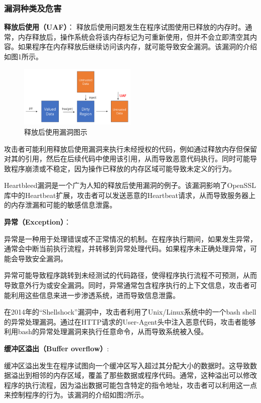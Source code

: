 \subsubsection{漏洞种类及危害}
\textbf{释放后使用（UAF）}：
	释放后使用问题发生在程序试图使用已释放的内存时。通常，内存释放后，操作系统会将该内存标记为可重新使用，但并不会立即清空其内容。如果程序在内存释放后继续访问该内存，就可能导致安全漏洞。该漏洞的介绍如图1所示。
	\begin{figure}[htbp]
		\centering
		\includegraphics[width=0.5\textwidth]{pictures/UAF.png}
		\caption{释放后使用漏洞图示}
		\label{fig:UAF}
	\end{figure}
攻击者可能利用释放后使用漏洞来执行未经授权的代码，例如通过释放内存但保留对其的引用，然后在后续代码中使用该引用，从而导致恶意代码执行。同时可能导致程序崩溃或不稳定，因为操作已释放的内存区域可能导致未定义的行为。

Heartbleed漏洞是一个广为人知的释放后使用漏洞的例子。该漏洞影响了OpenSSL库中的Heartbeat扩展，攻击者可以发送恶意的Heartbeat请求，从而导致服务器上的内存泄漏和可能的敏感信息泄露。

\textbf{异常（Exception）}：
	
异常是一种用于处理错误或不正常情况的机制。在程序执行期间，如果发生异常，通常会中断当前执行流程，并转移到异常处理代码。如果程序未正确处理异常，可能会导致安全漏洞。

异常可能导致程序跳转到未经测试的代码路径，使得程序执行流程不可预测，从而导致意外行为或安全漏洞。同时，异常通常包含程序执行的上下文信息，攻击者可能利用这些信息来进一步渗透系统，进而导致信息泄露。

在2014年的``Shellshock''漏洞中，攻击者利用了Unix/Linux系统中的一个bash
shell的异常处理漏洞。通过在HTTP请求的User-Agent头中注入恶意代码，攻击者能够利用bash的异常处理漏洞来执行任意命令，从而导致系统被入侵。
	
\textbf{缓冲区溢出（Buffer overflow）}:
	
缓冲区溢出发生在程序试图向一个缓冲区写入超过其分配大小的数据时。这导致数据溢出到相邻的内存区域，覆盖了那些数据或程序代码。通常，这种溢出可以修改程序的执行流程，因为溢出数据可能包含特定的指令地址，攻击者可以利用这一点来控制程序的行为。该漏洞的介绍如图2所示。
	
